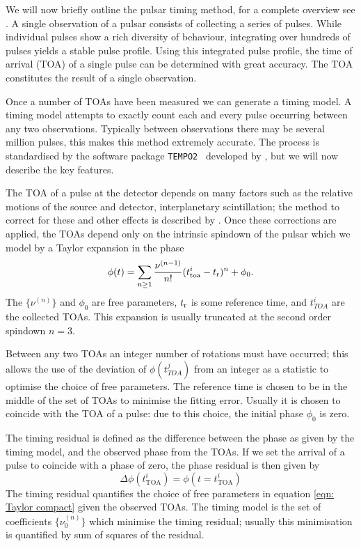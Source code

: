 We will now briefly outline the pulsar timing method, for a complete overview
see \citet{Lyne2012book}. A single observation of a pulsar consists of
collecting a series of pulses. While individual pulses show a rich diversity of
behaviour, integrating over hundreds of pulses yields a stable pulse profile.
Using this integrated pulse profile, the time of arrival (TOA) of a single pulse can be
determined with great accuracy. The TOA constitutes the result of a single
observation. 

Once a number of TOAs have been measured we can generate a timing model.  A
timing model attempts to exactly count each and every pulse occurring between
any two observations. Typically between observations there may be several
million pulses, this makes this method extremely accurate. The process is
standardised by the software package \verb+TEMPO2 + developed by
\citet{Hobbs2006}, but we will now describe the key features.

The TOA of a pulse at the detector depends on many factors such as the relative
motions of the source and detector, interplanetary scintillation; the method to
correct for these and other effects is described by \citet{Edwards2006}.  Once
these corrections are applied, the TOAs depend only on the intrinsic spindown
of the pulsar which we model by a Taylor expansion in the phase
\begin{equation}
    \phi(t) = \sum_{n\ge 1}\frac{\nu^{(n-1)}}{n!}(t_{\textrm{toa}}^{i} -
    t_{\textrm{r}})^{n} + \phi_{0}.
    \label{eqn: Taylor compact}
\end{equation}
The $\{\nu^{(n)}\}$ and $\phi_{0}$ are free parameters,
$t_{\textrm{r}}$ is some reference time, and $t_{TOA}^{i}$ are the collected TOAs. This
expansion is usually truncated at the second order spindown $n=3$.

Between any two TOAs an integer number of rotations must have occurred; this
allows the use of the deviation of $\phi(t_{TOA}^{j})$ from an integer as a
statistic to optimise the choice of free parameters. The reference time is
chosen to be in the middle of the set of TOAs to minimise the fitting
error. Usually it is chosen to coincide with the TOA of a pulse: due to
this choice, the initial phase $\phi_{0}$ is zero. 

The timing residual is defined as the difference between
the phase as given by the timing model, and the observed phase from the TOAs. 
If we set the arrival of a pulse to coincide with a phase of zero, the phase
residual is then given by
\begin{equation}
    \Delta\phi \left(t^{i}_{\mathrm{TOA}}\right) = 
    \phi \left(t=t^{i}_{\mathrm{TOA}}\right)
\end{equation}
The timing residual quantifies the choice of free parameters in equation 
\eqref{eqn: Taylor compact} given the observed TOAs. 
The timing model is the set of coefficients $\{\nu_{0}^{(n)}\}$ which minimise the
timing residual; usually this minimisation is quantified by sum of squares of the
residual.

